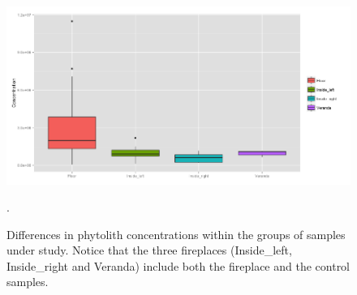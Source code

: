 \documentclass[authoryear,preprint,review,12pt]{elsarticle}
\begin{document}
\begin{figure}[ht!]
  \begin{center}
    \includegraphics[width=15cm]{figures/concentration_groups}
    \caption{Differences in phytolith concentrations within the groups of samples under study.  Notice that the three fireplaces (Inside\_left, Inside\_right and Veranda) include both the fireplace and the control samples.}.
    \label{fig:conc}
  \end{center}
\end{figure}
\end{document}
